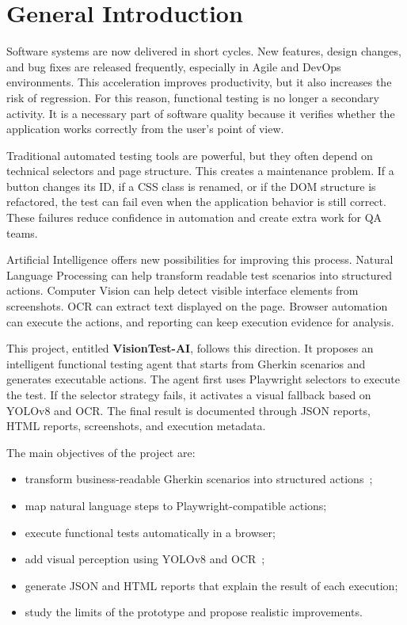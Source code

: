 \chapter*{General Introduction}

Software systems are now delivered in short cycles. New features, design changes, and bug fixes are released frequently, especially in Agile and DevOps environments. This acceleration improves productivity, but it also increases the risk of regression. For this reason, functional testing is no longer a secondary activity. It is a necessary part of software quality because it verifies whether the application works correctly from the user's point of view.

Traditional automated testing tools are powerful, but they often depend on technical selectors and page structure. This creates a maintenance problem. If a button changes its ID, if a CSS class is renamed, or if the DOM structure is refactored, the test can fail even when the application behavior is still correct. These failures reduce confidence in automation and create extra work for QA teams.

Artificial Intelligence offers new possibilities for improving this process. Natural Language Processing can help transform readable test scenarios into structured actions. Computer Vision can help detect visible interface elements from screenshots. OCR can extract text displayed on the page. Browser automation can execute the actions, and reporting can keep execution evidence for analysis.

This project, entitled \textbf{VisionTest-AI}, follows this direction. It proposes an intelligent functional testing agent that starts from Gherkin scenarios and generates executable actions. The agent first uses Playwright selectors to execute the test. If the selector strategy fails, it activates a visual fallback based on YOLOv8 and OCR. The final result is documented through JSON reports, HTML reports, screenshots, and execution metadata.

The main objectives of the project are:

\begin{itemize}
	\item transform business-readable Gherkin scenarios into structured actions~\cite{gherkin_reference};
	\item map natural language steps to Playwright-compatible actions;
	\item execute functional tests automatically in a browser;
	\item add visual perception using YOLOv8 and OCR~\cite{ultralytics_yolov8_docs,tesseract_docs};
	\item generate JSON and HTML reports that explain the result of each execution;
	\item study the limits of the prototype and propose realistic improvements.
\end{itemize}

